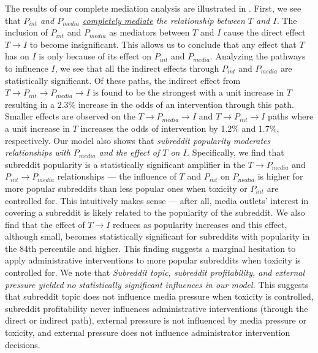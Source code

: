  The results of our complete
mediation analysis are illustrated in . 
First, we see that \emph{$P_{int}$ and $P_{media}$ \underline{completely mediate} the
    relationship between $T$ and $I$.} The inclusion of $P_{int}$ and
    $P_{media}$ as mediators between $T$ and $I$ cause the direct effect $T
    \rightarrow I$ to become insignificant. This allows us to conclude that any
    effect that $T$ has on $I$ is only because of its effect on $P_{int}$ and
    $P_{media}$. Analyzing the pathways to influence $I$, we see that all the
    indirect effects through $P_{int}$ and $P_{media}$ are statistically
    significant. Of these paths, the indirect
    effect from $T \rightarrow P_{int} \rightarrow P_{media} \rightarrow I$ is
    found to be the strongest with a unit increase in $T$ resulting in a 2.3\%
    increase in the odds of an intervention through this path. Smaller effects
    are observed on the $T \rightarrow P_{media} \rightarrow I$ and $T
    \rightarrow P_{int} \rightarrow I$ paths where a unit increase in $T$
    increases the odds of intervention by 1.2\% and 1.7\%, respectively.
Our model also shows that \emph{subreddit popularity moderates relationships with $P_{media}$ and
    the effect of $T$ on $I$.} Specifically, we find that subreddit popularity
    is a statistically
    significant amplifier in the $T \rightarrow P_{media}$ and $P_{int}
    \rightarrow P_{media}$ relationships --- \ie the influence of $T$ and
    $P_{int}$ on $P_{media}$ is higher for more popular subreddits than less
    popular ones when toxicity or $P_{int}$ are controlled for. This
    intuitively makes sense --- after all, media outlets' interest in covering
    a subreddit is likely related to the popularity of the subreddit. We
    also find that the effect of $T \rightarrow I$ reduces as popularity
    increases and this effect, although small, becomes statistically
    significant for subreddits with popularity in the 84th percentile and
    higher. This finding suggests a marginal hesitation to apply
    administrative interventions to more popular subreddits when toxicity is
    controlled for.
We note that \emph{Subreddit topic, subreddit
    profitability, and external pressure yielded no statistically significant
    influences in our model.} This suggests that subreddit topic does not
    influence     media pressure when toxicity is controlled, subreddit
    profitability never     influences administrative interventions (through
    the direct or indirect     path), external pressure is not influenced by
    media pressure or toxicity,     and external pressure does not influence
    administrator intervention     decisions.


